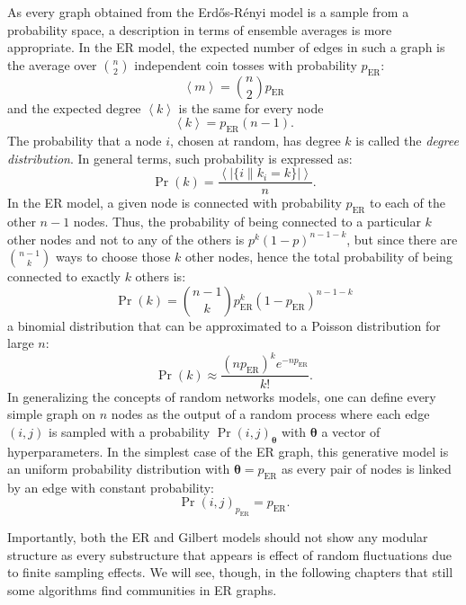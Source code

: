 As every graph obtained from the Erd\H{o}s-Rényi model is a sample from a probability space, a description in terms of ensemble averages is more appropriate.
In the ER model, the expected number of edges in such a graph is the average over $\binom{n}{2}$ independent coin tosses with probability $p_{\textrm{ER}}$:
\begin{equation}
\left< m  \right> = \binom{n}{2}p_{\textrm{ER}}
\end{equation}
and the expected degree $\left< k \right>$ is the same for every node
\begin{equation}
\left< k \right> = p_{\textrm{ER}}(n-1).
\end{equation}
The probability that a node $i$, chosen at random, has degree $k$ is called the \emph{degree distribution}. In general terms, such probability is expressed as:
\begin{equation}
\Pr(k) = \frac{\left< |\{ i \| k_i=k \}| \right>}{n}.
\end{equation}
In the ER model, a given node is connected with probability $p_{\textrm{ER}}$ to each of the other $n-1$ nodes. Thus, the probability of being connected to a particular $k$ other nodes and not to any of the others is $p^k(1-p)^{n-1-k}$, but since there are $\binom{n-1}{k}$ ways to choose those $k$ other nodes, hence the total probability of being connected to exactly $k$ others is:
\begin{equation}
\Pr(k) = \binom{n-1}{k}p_{\textrm{ER}}^k(1-p_{\textrm{ER}})^{n-1-k}
\end{equation}
a binomial distribution that can be approximated to a Poisson distribution for large $n$:
\begin{equation}
\Pr(k) \approx \frac{(n p_{\textrm{ER}})^k e^{-n p_{\textrm{ER}}} }{k!}.
\end{equation}
\bigbreak
In generalizing the concepts of random networks models, one can define every simple graph on $n$ nodes as the output of a random process where each edge $(i,j) $ is sampled with a probability $\Pr(i,j)_{ \boldsymbol \theta}$ with $\boldsymbol \theta$ a vector of hyperparameters. In the simplest case of the ER graph, this generative model is an uniform probability distribution with $\boldsymbol \theta=p_{\textrm{ER}}$ as every pair of nodes is linked by an edge with constant probability:
\begin{equation}
\Pr({i,j})_{p_{\textrm{ER}}} = p_{\textrm{ER}}.
\end{equation}

Importantly, both the ER and Gilbert models should not show any modular structure as every substructure that appears is effect of random fluctuations due to finite sampling effects. We will see, though, in the following chapters that still some algorithms find communities in ER graphs.

